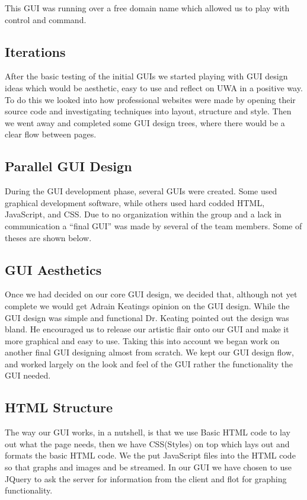 This GUI was running over a free domain name which allowed us to play with control and command. 

\subsection{Iterations}

After the basic testing of the initial GUIs we started playing with GUI design ideas which would be aesthetic, easy to use and reflect on UWA in a positive way.  To do this we looked into how professional websites were made by opening their source code and investigating techniques into layout, structure and style. Then we went away and completed some GUI design trees, where there would be a clear flow between pages.  

\subsection{Parallel GUI Design}

During the GUI development phase, several GUIs were created. Some used graphical development software, while others used hard codded HTML, JavaScript, and CSS.  Due to no organization within the group and a lack in communication a ``final GUI'' was made by several of the team members.  Some of theses are shown below.

\subsection{GUI Aesthetics}

Once we had decided on our core GUI design, we decided that, although not yet complete we would get Adrain Keatings opinion on the GUI design. While the GUI design was simple and functional Dr. Keating pointed out the design was bland. He encouraged us to release our artistic flair onto our GUI and make it more graphical and easy to use. Taking this into account we began work on another final GUI designing almost from scratch. We kept our GUI design flow, and worked largely on the look and feel of the GUI rather the functionality the GUI needed. 

\subsection{HTML Structure}

The way our GUI works, in a nutshell, is that we use Basic HTML code to lay out what the page needs, then we have CSS(Styles) on top which lays out and formats the basic HTML code. We the put JavaScript files into the HTML code so that graphs and images and be streamed. In our GUI we have chosen to use JQuery to ask the server for information from the client and flot for graphing functionality. 

